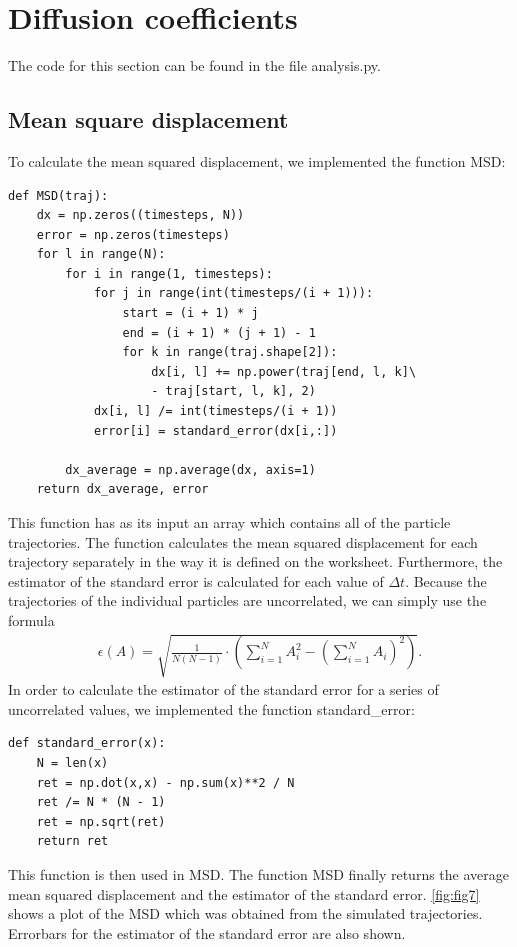 \documentclass[a4paper,10pt,bibtotoc]{scrartcl}
\begin{document}
\section{Diffusion coefficients}
The code for this section can be found in the file analysis.py.
\subsection{Mean square displacement}
To calculate the mean squared displacement, we implemented the function MSD:
\begin{lstlisting}
def MSD(traj):
    dx = np.zeros((timesteps, N))
    error = np.zeros(timesteps)
    for l in range(N):
        for i in range(1, timesteps):
            for j in range(int(timesteps/(i + 1))):
                start = (i + 1) * j
                end = (i + 1) * (j + 1) - 1
                for k in range(traj.shape[2]):
                    dx[i, l] += np.power(traj[end, l, k]\
                    - traj[start, l, k], 2)
            dx[i, l] /= int(timesteps/(i + 1))
            error[i] = standard_error(dx[i,:])
        
        dx_average = np.average(dx, axis=1)
    return dx_average, error
\end{lstlisting}
This function has as its input an array which contains all of the particle trajectories. 
The function calculates the mean squared displacement for each trajectory separately in the way it is defined on the worksheet. 
Furthermore, the estimator of the standard error is calculated for each value of $\Delta t$. 
Because the trajectories of the individual particles are uncorrelated, we can simply use the formula
\begin{align}
\epsilon(A) = \sqrt{\frac{1}{N(N-1)}\cdot \left(\sum_{i=1}^{N} A_i^2 - \left(\sum_{i=1}^{N} A_i\right)^2\right)}.
\end{align}
In order to calculate the estimator of the standard error for a series of uncorrelated values, we implemented the function standard\_error:
\begin{lstlisting}
def standard_error(x):
    N = len(x)
    ret = np.dot(x,x) - np.sum(x)**2 / N
    ret /= N * (N - 1)
    ret = np.sqrt(ret)
    return ret
\end{lstlisting}
This function is then used in MSD. 
The function MSD finally returns the average mean squared displacement and the estimator of the standard error.
\autoref{fig:fig7} shows a plot of the MSD which was obtained from the simulated trajectories.
Errorbars for the estimator of the standard error are also shown.
\end{document}
